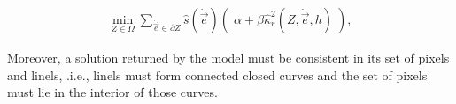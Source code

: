 	\begin{align*}
	\min_{Z \in \Omega} \sum_{\dot{\vec{e}} \in \partial Z}{ \hat{s}( \dot{\vec{e}})\left(\; \alpha + \beta \hat{\kappa}_{r}^2(Z,\dot{\vec{e}},h) \; \right)},
	\end{align*}


Moreover, a solution returned by the model must be consistent in its set of pixels and linels, .i.e., linels must form connected closed curves and the set of pixels must lie in the interior of those curves.



